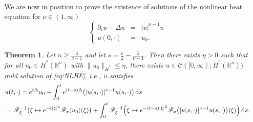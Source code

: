\documentclass[a4paper, 12pt]{article}
\theoremstyle{plain}
\newtheorem{theorem}[proposition]{Theorem}
\theoremstyle{definition}
\theoremstyle{remark}
\numberwithin{equation}{section}
\begin{document}
We are now in position to prove the existence of solutions of the nonlinear heat equation for $\nu\in(1,\infty)$
%
\begin{equation}
\label{eq:NLHE}\tag{NLHE}
\left\{
\begin{array}{rcl}
\partial_tu-\Delta u&=&|u|^{\nu-1}u\\
u(0,\cdot)&=&u_0.
\end{array}
\right.
\end{equation}
%
\begin{theorem}
\label{thm:existenceNLHE}
Let $n\ge \frac{4}{\nu-1}$ and let $s=\frac{n}{2}-\frac{2}{\nu-1}$. Then there exists $\eta>0$ such that for all $u_0\in\dot H^s({\mathds{R}}^n)$
with $\|u_0\|_{\dot H^s}\le \eta$, there exists $u\in {\mathscr{C}}([0,\infty);\dot H^s({\mathds{R}}^n))$ mild solution of \eqref{eq:NLHE}, $i.e.$,
$u$ satisfies
%
\begin{align*}
&u(t,\cdot)=e^{t\Delta}u_0 + \int_0^t e^{(t-s)\Delta}\bigl(|u(s,\cdot)|^{\nu-1}u(s,\cdot)\bigr)\,{\rm d}s\\
&={\mathscr{F}}_\xi^{-1}\bigl(\xi\mapsto e^{-t|\xi|^2}{\mathscr{F}}_x(u_0)(\xi)\bigr)
+\int_0^t {\mathscr{F}}_\xi^{-1}\Bigl(\xi \mapsto e^{-(t-s)|\xi|^2}{\mathscr{F}}_x\bigl(|u(s,\cdot)|^{\nu-1}u(s,\cdot)\bigr)(\xi)\Bigr)\,{\rm d}s.
\end{align*}
\end{theorem}
\end{document}
